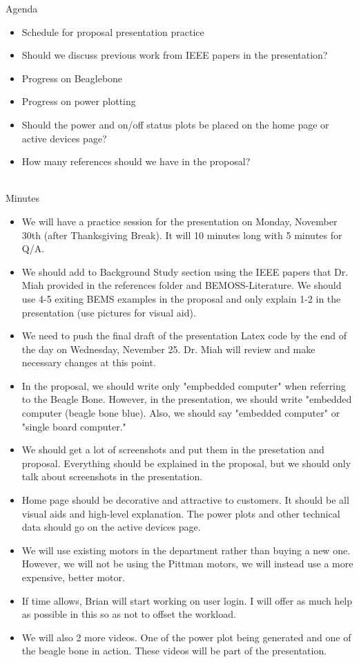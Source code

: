 \documentclass[fontsize=11pt, %
                             paper=letter, %
                             openany, %
                             captions=tableheading,
                             index=totoc,
                             hyperref]{labbook}
\begin{document}
Agenda
\begin{itemize}
\item Schedule for proposal presentation practice
\item Should we discuss previous work from IEEE papers in the presentation?
\item Progress on Beaglebone
\item Progress on power plotting
\item Should the power and on/off status plots be placed on the home page or active devices page?
\item How many references should we have in the proposal?
\end{itemize}
\\
Minutes
\begin{itemize}
\item We will have a practice session for the presentation on Monday, November 30th (after Thanksgiving Break). It will 10 minutes long with 5 minutes for Q/A.
\item We should add to Background Study section using the IEEE papers that Dr. Miah provided in the references folder and BEMOSS-Literature. We should use 4-5 exiting BEMS examples in the proposal and only explain 1-2 in the presentation (use pictures for visual aid).
\item We need to push the final draft of the presentation Latex code by the end of the day on Wednesday, Nevember 25. Dr. Miah will review and make necessary changes at this point.
\item In the proposal, we should write only "empbedded computer" when referring to the Beagle Bone. However, in the presentation, we should write "embedded computer (beagle bone blue). Also, we should say "embedded computer" or "single board computer."
\item We should get  a lot of screenshots and put them in the presetation and proposal. Everything should be explained in the proposal, but we should only talk about screenshots in the presentation.
\item Home page should be decorative and attractive to customers. It should be all visual aids and high-level explanation. The power plots and other technical data should go on the active devices page.
\item We will use existing motors in the department rather than buying a new one. However, we will not be using the Pittman motors, we will instead use a more expensive, better motor.
\item If time allows, Brian will start working on user login. I will offer as much help as possible in this so as not to offset the workload. 
\item We will also 2 more videos. One of the power plot being generated and one of the beagle bone in action. These videos will be part of the presentation.
\end{itemize}
\end{document}
